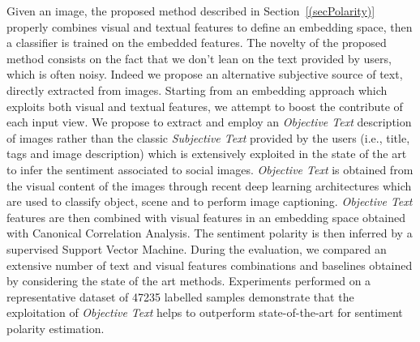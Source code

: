 Given an image, the proposed method described in Section~\ref{(secPolarity)} properly combines visual and textual features to define an embedding space, then a classifier is trained on the embedded features. The novelty of the proposed method consists on the fact that we don't lean on the text provided by users, which is often noisy. Indeed we propose an alternative subjective source of text, directly extracted from images.
Starting from an embedding approach which exploits both visual and textual features, we attempt to boost the contribute of each input view. We propose to extract and employ an \textit{Objective Text} description of images rather than the classic \textit{Subjective Text} provided by the users (i.e., title, tags and image description) which is extensively exploited in the state of the art to infer the sentiment associated to social images. \textit{Objective Text} is obtained from the visual content of the images through recent deep learning architectures which are used to classify object, scene and to perform image captioning. \textit{Objective Text} features are then combined with visual features in an embedding space obtained with Canonical Correlation Analysis. The sentiment polarity is then inferred by a supervised Support Vector Machine.
During the evaluation, we compared an extensive number of text and visual features combinations and baselines obtained by considering the state of the art methods. 
Experiments performed on a representative dataset of 47235 labelled samples demonstrate that the exploitation of \textit{Objective Text} helps to outperform state-of-the-art for sentiment polarity estimation. 


